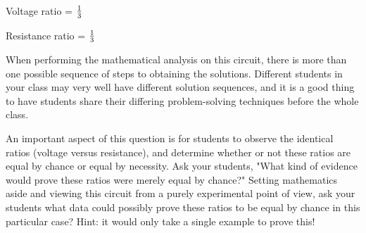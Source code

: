 \vskip 10pt

Voltage ratio = $1 \over 3$

\vskip 10pt

Resistance ratio = $1 \over 3$







When performing the mathematical analysis on this circuit, there is more than one possible sequence of steps to obtaining the solutions.  Different students in your class may very well have different solution sequences, and it is a good thing to have students share their differing problem-solving techniques before the whole class.

An important aspect of this question is for students to observe the identical ratios (voltage versus resistance), and determine whether or not these ratios are equal by chance or equal by necessity.  Ask your students, "What kind of evidence would prove these ratios were merely equal by chance?"  Setting mathematics aside and viewing this circuit from a purely experimental point of view, ask your students what data could possibly prove these ratios to be equal by chance in this particular case?  Hint: it would only take a single example to prove this!




